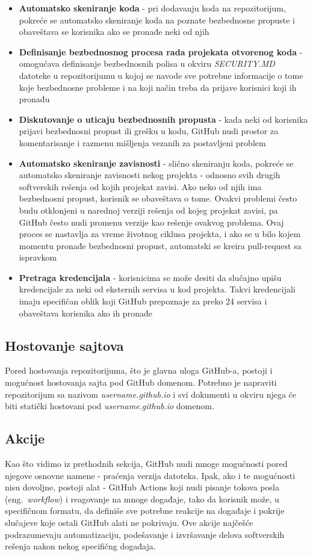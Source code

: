\documentclass[12pt]{report}
\begin{document}
\begin{itemize}
    \item \textbf{Automatsko skeniranje koda} - pri dodavanju koda na repozitorijum, pokreće se automatsko skeniranje koda na poznate bezbednosne propuste i obaveštava se korisnika ako se pronađe neki od njih
    \item \textbf{Definisanje bezbednosnog procesa rada projekata otvorenog koda} - omogućava definisanje bezbednosnih polisa u okviru \textit{SECURITY.MD} datoteke u repozitorijumu u kojoj se navode sve potrebne informacije o tome koje bezbednosne probleme i na koji način treba da prijave korisnici koji ih pronađu
    \item \textbf{Diskutovanje o uticaju bezbednosnih propusta} - kada neki od korisnika prijavi bezbednosni propust ili grešku u kodu, GitHub nudi prostor za komentarisanje i razmenu mišljenja vezanih za postavljeni problem
    \item \textbf{Automatsko skeniranje zavisnosti} - slično skeniranju koda, pokreće se automatsko skeniranje zavisnosti nekog projekta - odnosno svih drugih softverskih rešenja od kojih projekat zavisi. Ako neko od njih ima bezbednosni propust, korisnik se obaveštava o tome. Ovakvi problemi često budu otklonjeni u narednoj verziji rešenja od kojeg projekat zavisi, pa GitHub često nudi promenu verzije kao rešenje ovakvog problema. Ovaj proces se nastavlja za vreme životnog ciklusa projekta, i ako se u bilo kojem momentu pronađe bezbednosni propust, automatski se kreira pull-request sa ispravkom
    \item \textbf{Pretraga kredencijala} - korisnicima se može desiti da slučajno upišu kredencijale za neki od eksternih servisa u kod projekta. Takvi kredencijali imaju specifičan oblik koji GitHub prepoznaje za preko 24 servisa i obaveštava korisnika ako ih pronađe
\end{itemize}

\subsection{Hostovanje sajtova}
Pored hostovanja repozitorijuma, što je glavna uloga GitHub-a, postoji i mogućnost hostovanja sajta pod GitHub domenom. Potrebno je napraviti repozitorijum sa nazivom \textit{username.github.io} i svi dokumenti u okviru njega će biti statički hostovani pod \textit{username.github.io} domenom.

\subsection{Akcije}
Kao što vidimo iz prethodnih sekcija, GitHub nudi mnoge mogućnosti pored njegove osnovne namene - praćenja verzija datoteka. Ipak, ako i te mogućnosti nisu dovoljne, postoji alat - GitHub Actions koji nudi pisanje tokova posla (eng.\ \textit{workflow}) i reagovanje na mnoge događaje, tako da korisnik može, u specifičnom formatu, da definiše sve potrebne reakcije na događaje i pokrije slučajeve koje ostali GitHub alati ne pokrivaju. Ove akcije najčešće podrazumevaju automatizaciju, podešavanje i izvršavanje delova softverskih rešenja nakon nekog specifičng događaja.
\end{document}

